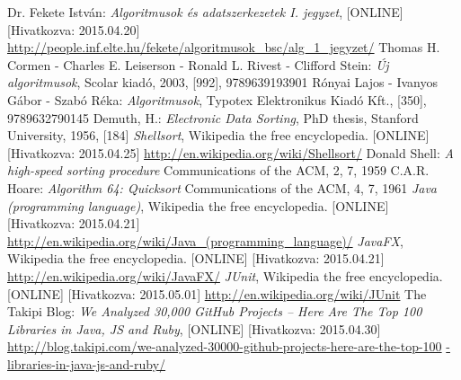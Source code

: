 \documentclass{elteikthesis}
\begin{document}
\begin{thebibliography}{widest entry}
Dr. Fekete István:
\emph{Algoritmusok és adatszerkezetek I. jegyzet},
[ONLINE] [Hivatkozva: 2015.04.20] \url{http://people.inf.elte.hu/fekete/algoritmusok_bsc/alg_1_jegyzet/}
Thomas H. Cormen - Charles E. Leiserson - Ronald L. Rivest - Clifford Stein:
\emph{Új algoritmusok},
Scolar kiadó, 2003,
[992], 9789639193901
Rónyai Lajos - Ivanyos Gábor - Szabó Réka:
\emph{Algoritmusok},
Typotex Elektronikus Kiadó Kft.,
[350], 9789632790145
Demuth, H.:
\emph{Electronic Data Sorting},
PhD thesis, Stanford University,
1956, [184]
\emph{Shellsort},
Wikipedia the free encyclopedia.
[ONLINE] [Hivatkozva: 2015.04.25]
\url{http://en.wikipedia.org/wiki/Shellsort/}
Donald Shell:
\emph{A high-speed sorting procedure}
Communications of the ACM, 2, 7, 1959
C.A.R. Hoare:
\emph{Algorithm 64: Quicksort}
Communications of the ACM, 4, 7, 1961
\emph{Java (programming language)},
Wikipedia the free encyclopedia.
[ONLINE] [Hivatkozva: 2015.04.21]
\url{http://en.wikipedia.org/wiki/Java_(programming_language)/}
\emph{JavaFX},
Wikipedia the free encyclopedia.
[ONLINE] [Hivatkozva: 2015.04.21]
\url{http://en.wikipedia.org/wiki/JavaFX/}
\emph{JUnit},
Wikipedia the free encyclopedia.
[ONLINE] [Hivatkozva: 2015.05.01]
\url{http://en.wikipedia.org/wiki/JUnit}
The Takipi Blog:
\emph{We Analyzed 30,000 GitHub Projects – Here Are The Top 100 Libraries in Java, JS and Ruby},
[ONLINE] [Hivatkozva: 2015.04.30] \url{http://blog.takipi.com/we-analyzed-30000-github-projects-here-are-the-top-100}
\url{-libraries-in-java-js-and-ruby/}
\end{thebibliography}
\end{document}
